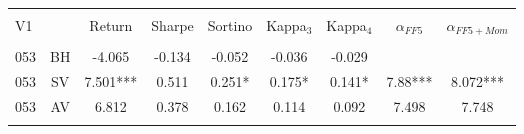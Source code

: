 \begin{tabular}{@{\extracolsep{5pt}} Hcccccccc} 
	\\[-1.8ex]\hline 
	\hline \\[-1.8ex] 
	V1 &  & Return & Sharpe & Sortino & Kappa$_{3}$ & Kappa$_{4}$ & $\alpha_{FF5}$ & $\alpha_{FF5+Mom}$ \\ 
	\hline \\[-1.8ex] 
	053 & BH & -4.065 & -0.134 & -0.052 & -0.036 & -0.029 &  &  \\ 
	053 & SV & 7.501*** & 0.511 & 0.251* & 0.175* & 0.141* & 7.88*** & 8.072*** \\ 
	053 & AV & 6.812 & 0.378 & 0.162 & 0.114 & 0.092 & 7.498 & 7.748 \\ 
	\hline \\[-1.8ex] 
\end{tabular} 